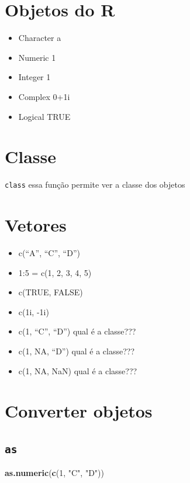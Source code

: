 \documentclass[]{book}
\newenvironment{Shaded}{\begin{snugshade}}{\end{snugshade}}
\newcommand{\KeywordTok}[1]{\textcolor[rgb]{0.13,0.29,0.53}{\textbf{#1}}}
\newcommand{\DecValTok}[1]{\textcolor[rgb]{0.00,0.00,0.81}{#1}}
\newcommand{\StringTok}[1]{\textcolor[rgb]{0.31,0.60,0.02}{#1}}
\newcommand{\NormalTok}[1]{#1}
\providecommand{\tightlist}{%
  \setlength{\itemsep}{0pt}\setlength{\parskip}{0pt}}
\theoremstyle{definition}
\theoremstyle{definition}
\theoremstyle{definition}
\theoremstyle{remark}
\begin{document}
\section{Objetos do R}\label{objetos-do-r}

\begin{itemize}
\tightlist
\item
  Character a
\item
  Numeric 1
\item
  Integer 1
\item
  Complex 0+1i
\item
  Logical TRUE
\end{itemize}

\section{Classe}\label{classe}

\texttt{class} essa função permite ver a classe dos objetos

\section{Vetores}\label{vetores}

\begin{itemize}
\tightlist
\item
  c(``A'', ``C'', ``D'')
\item
  1:5 = c(1, 2, 3, 4, 5)
\item
  c(TRUE, FALSE)
\item
  c(1i, -1i)
\item
  c(1, ``C'', ``D'') qual é a classe???
\item
  c(1, NA, ``D'') qual é a classe???
\item
  c(1, NA, NaN) qual é a classe???
\end{itemize}

\section{Converter objetos}\label{converter-objetos}

\subsection{\texorpdfstring{\texttt{as}}{as}}\label{as}

\begin{Shaded}
\begin{Highlighting}[]
\KeywordTok{as.numeric}\NormalTok{(}\KeywordTok{c}\NormalTok{(}\DecValTok{1}\NormalTok{, }\StringTok{"C"}\NormalTok{, }\StringTok{"D"}\NormalTok{))}
\end{Highlighting}
\end{Shaded}
\end{document}
